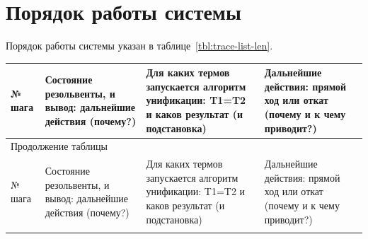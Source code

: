 \section{Порядок работы системы}
Порядок работы системы указан в таблице~\ref{tbl:trace-list-len}.
\begin{center}
    \begin{tabularx}{\textwidth}{|p{2cm}|X|X|X|}
        \caption{\label{tbl:trace-list-len}Порядок работы системы для запроса } \\ \hline
        № шага & Состояние резольвенты, и вывод: дальнейшие действия (почему?) & Для каких термов запускается алгоритм унификации: T1=T2 и каков результат (и подстановка) & Дальнейшие действия: прямой ход или откат (почему и к чему приводит?) \\ \hline
        \endfirsthead

        \multicolumn{4}{l}{{Продолжение таблицы\ \thetable{}}} \\ \hline
        № шага & Состояние резольвенты, и вывод: дальнейшие действия (почему?) & Для каких термов запускается алгоритм унификации: T1=T2 и каков результат (и подстановка) & Дальнейшие действия: прямой ход или откат (почему и к чему приводит?) \\ \hline
        \endhead

        \hline
        \endfoot
        \endlastfoot


\end{tabularx}
\end{center}
